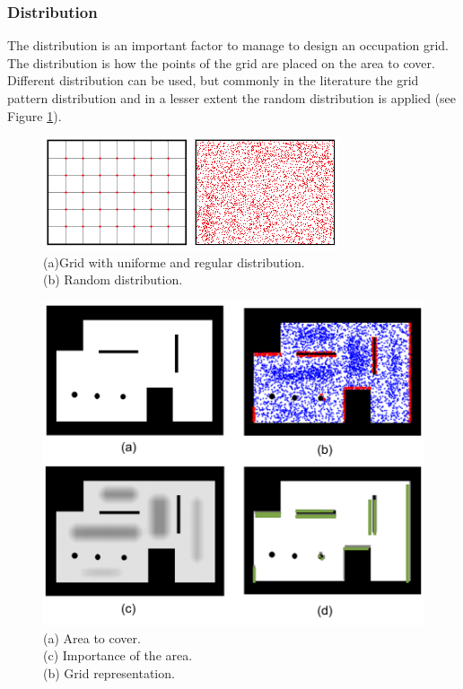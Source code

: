 \subsubsection{Distribution}
The distribution is an important factor to manage to design an occupation grid. The distribution is how the  points of the grid are placed on the area to cover.
Different distribution can be used, but commonly in the literature the grid pattern distribution and in a lesser extent the random distribution is applied (see Figure \ref{fig:GridVsRand}). \\
\begin{figure}[t!]
\begin{center}
   \includegraphics[width=\linewidth]{img/GridVsRand.png}
  \caption{(a)Grid with uniforme and regular distribution.\\   
(b) Random distribution.\\  
}\label{fig:GridVsRand}
  \endminipage\hfill
  \end{center}
\end{figure}
\begin{figure}[t!]
\begin{center}
   \includegraphics[width=\linewidth]{img/randomGridRef171.png}
  \caption{(a) Area  to cover.\\   
(c) Importance of the area.\\  
(b) Grid representation.}\label{fig:randomGridRef171}
  \endminipage\hfill
  \end{center}
\end{figure}

